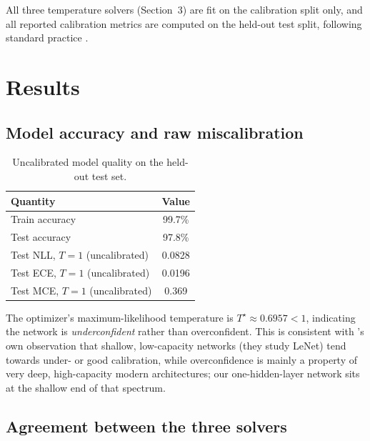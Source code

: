 \documentclass[11pt]{article}
\begin{document}
All three temperature solvers (Section~3) are fit on the calibration
split only, and all reported calibration metrics are computed on the
held-out test split, following standard practice
\citep{guo2017calibration}.

\section{Results}

\subsection{Model accuracy and raw miscalibration}

\begin{table}[h]
\centering
\begin{tabular}{lc}
\toprule
Quantity & Value \\
\midrule
Train accuracy & 99.7\% \\
Test accuracy & 97.8\% \\
Test NLL, $T=1$ (uncalibrated) & 0.0828 \\
Test ECE, $T=1$ (uncalibrated) & 0.0196 \\
Test MCE, $T=1$ (uncalibrated) & 0.369 \\
\bottomrule
\end{tabular}
\caption{Uncalibrated model quality on the held-out test set.}
\label{tab:raw}
\end{table}

The optimizer's maximum-likelihood temperature is $T^\star \approx
0.6957 < 1$, indicating the network is \emph{underconfident} rather
than overconfident. This is consistent with \citet{guo2017calibration}'s
own observation that shallow, low-capacity networks (they study LeNet)
tend towards under- or good calibration, while overconfidence is
mainly a property of very deep, high-capacity modern architectures;
our one-hidden-layer network sits at the shallow end of that spectrum.

\subsection{Agreement between the three solvers}
\end{document}
